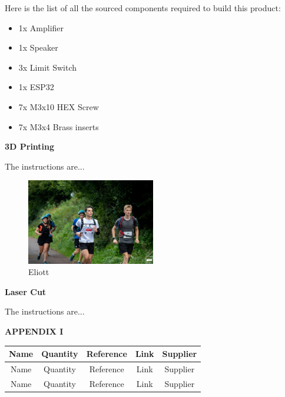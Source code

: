 \documentclass[9pt]{developercv}
\begin{document}
Here is the list of all the sourced components required to build this product:

\begin{itemize}
	\item 1x Amplifier
	\item 1x Speaker
	\item 3x Limit Switch
	\item 1x ESP32
	\item 7x M3x10 HEX Screw
	\item 7x M3x4 Brass inserts
\end{itemize}


\vspace{5mm}
\begin{center}
	\huge \textbf{3D Printing}
\end{center}


The instructions are...

\begin{figure}[htb]
	\centering
	\includegraphics[width=0.500000\textwidth]{./src/graphics/test.jpeg}
	\caption{Eliott}
\end{figure}

\vspace{5mm}
\begin{center}
	\huge \textbf{Laser Cut}
\end{center}


The instructions are...

\pagebreak

\vspace{55 mm}

\vspace{5mm}
\begin{center}
	{\HUGE\textbf{\MakeUppercase{Appendix I}}}
\end{center}

\begin{table}[h]
\centering
\begin{tabular}{c|c|c|c|c}
\textbf{Name}&\textbf{Quantity}&\textbf{Reference}&\textbf{Link}&\textbf{Supplier}\\
\hline
Name&Quantity&Reference&Link&Supplier\\
\hline
Name&Quantity&Reference&Link&Supplier\\
\end{tabular}
\end{table}
\end{document}
